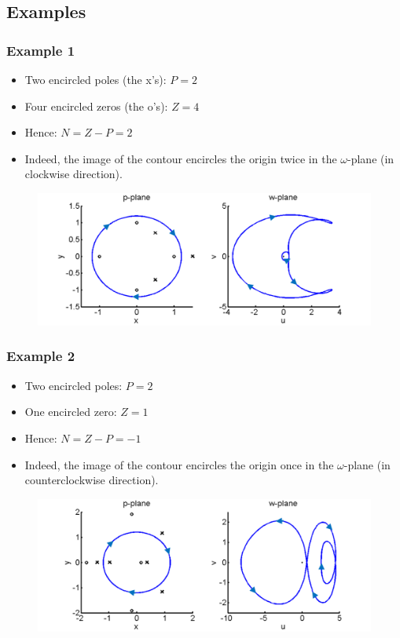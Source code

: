 \subsection{Examples}

\begin{frame}
	\frametitle{Example 1}
	\begin{itemize}
		\item Two encircled poles (the x's): $P=2$
		\item Four encircled zeros (the o's): $Z=4$
		\item Hence: $N = Z-P = 2$
		\item Indeed, the image of the contour encircles the origin twice in the $\omega$-plane (in clockwise direction).
	\end{itemize}
	\vspace{-2ex}
	\begin{figure}
		\includegraphics[width=0.95\linewidth]{example1}
	\end{figure}
\end{frame}

\begin{frame}
	\frametitle{Example 2}
	\begin{itemize}
		\item Two encircled poles: $P = 2$
		\item One encircled zero: $Z=1$
		\item Hence: $N=Z-P=-1$
		\item Indeed, the image of the contour encircles the origin once in the $\omega$-plane (in counterclockwise direction).
	\end{itemize}
	\vspace{-2ex}
	\begin{figure}
		\includegraphics[width=0.95\linewidth]{example2}
	\end{figure}
\end{frame}

